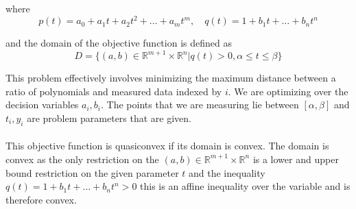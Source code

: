 where
\begin{equation}
    p(t) = a_0 + a_1 t + a_2 t^2 + \dots + a_m t^m, \quad q(t) = 1 + b_1 t + \dots + b_n t^n 
\end{equation}

and the domain of the objective function is defined as
\begin{equation}
    D = \{ (a,b) \in \mathbb{R}^{m+1} \times \mathbb{R}^n | q(t) > 0, \alpha \leq t \leq  \beta \}
\end{equation}

This problem effectively involves minimizing the maximum distance between a ratio of polynomials and measured data indexed by $i$. We are optimizing over the decision variables $a_i, b_i$. The points that we are measuring lie between $[\alpha, \beta]$ and $t_i, y_i$ are problem parameters that are given.
\\ \\
This objective function is quasiconvex if its domain is convex. The domain is convex as the only restriction on the $(a,b) \in \mathbb{R}^{m+1} \times \mathbb{R}^n$ is a lower and upper bound restriction on the given parameter $t$ and the inequality $q(t) = 1 + b_1 t + \dots + b_n t^n > 0$ this is an affine inequality over the variable and is therefore convex.
\\
